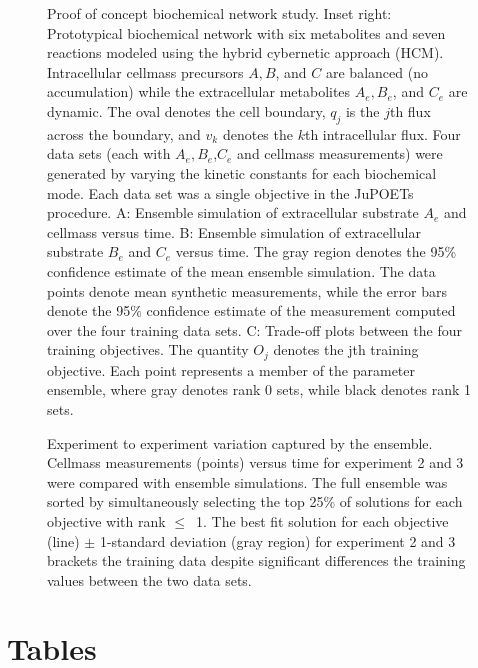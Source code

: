 \documentclass{bmcart}
\begin{document}
\begin{backmatter}
\begin{figure}[h]
  \caption{Proof of concept biochemical network study.
  Inset right: Prototypical biochemical network with six metabolites and seven reactions modeled using the hybrid cybernetic approach (HCM).
  Intracellular cellmass precursors $A,B$, and $C$ are balanced (no accumulation) while the extracellular metabolites $A_{e},B_{e}$, and $C_{e}$ are dynamic.
  The oval denotes the cell boundary, $q_{j}$ is the $j$th flux across the boundary, and $v_{k}$ denotes the $k$th intracellular flux.
  Four data sets (each with $A_{e},B_{e}$,$C_{e}$ and cellmass measurements) were generated by varying the kinetic constants for each biochemical mode.
  Each data set was a single objective in the JuPOETs procedure.
  A: Ensemble simulation of extracellular substrate $A_{e}$ and cellmass versus time.
  B: Ensemble simulation of extracellular substrate $B_{e}$ and $C_{e}$ versus time.
  The gray region denotes the 95\% confidence estimate of the mean ensemble simulation.
  The data points denote mean synthetic measurements, while the error bars denote the 95\% confidence estimate of the measurement computed over the four training data sets.
  C: Trade-off plots between the four training objectives. The quantity $O_{j}$ denotes the jth training objective.
  Each point represents a member of the parameter ensemble, where gray denotes rank 0 sets, while black denotes rank 1 sets.
   }\label{fig:fig-biochemical}
\end{figure}

\begin{figure}[h]
  \caption{Experiment to experiment variation captured by the ensemble.
  Cellmass measurements (points) versus time for experiment 2 and 3 were compared with ensemble simulations.
  The full ensemble was sorted by simultaneously selecting the top 25\% of solutions for each objective with rank $\leq$~1.
  The best fit solution for each objective (line) $\pm$ 1-standard deviation (gray region) for experiment 2 and 3 brackets the training data despite significant differences the training values between the two data sets.}\label{fig:fig-experiment-variation}
\end{figure}


\clearpage
\section*{Tables}


\end{backmatter}
\end{document}
